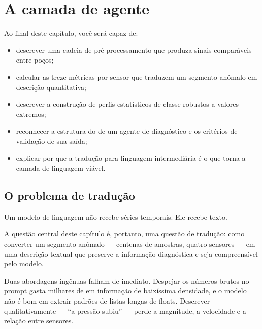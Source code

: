 \chapter{A camada de agente}
\label{cap:agente}

\begin{objetivos}
Ao final deste capítulo, você será capaz de:
\begin{itemize}[leftmargin=*,itemsep=0.2em]
  \item descrever uma cadeia de pré-processamento que produza sinais comparáveis entre
        poços;
  \item calcular as treze métricas por sensor que traduzem um segmento anômalo em
        descrição quantitativa;
  \item descrever a construção de perfis estatísticos de classe robustos a valores
        extremos;
  \item reconhecer a estrutura do  de um agente de diagnóstico e os
        critérios de validação de sua saída;
  \item explicar por que a tradução para linguagem intermediária é o que torna a camada
        de linguagem viável.
\end{itemize}
\end{objetivos}

\section{O problema de tradução}

Um modelo de linguagem não recebe séries temporais. Ele recebe texto.

A questão central deste capítulo é, portanto, uma questão de tradução: como converter um
segmento anômalo --- centenas de amostras, quatro sensores --- em uma descrição textual
que preserve a informação diagnóstica e seja compreensível pelo modelo.

Duas abordagens ingênuas falham de imediato. Despejar os números brutos no prompt gasta
milhares de  em informação de baixíssima densidade, e o modelo não é bom em
extrair padrões de listas longas de floats. Descrever qualitativamente --- ``a pressão
subiu'' --- perde a magnitude, a velocidade e a relação entre sensores.

